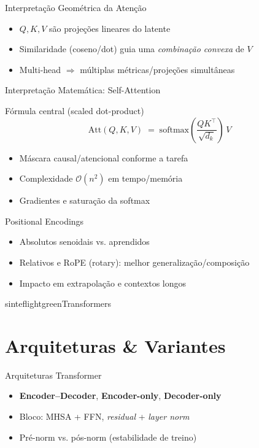 \documentclass{beamer}
\begin{document}
\begin{frame}{Interpretação Geométrica da Atenção}
	\begin{itemize}[<+->]
		\item $Q,K,V$ são projeções lineares do latente
		\item Similaridade (coseno/dot) guia uma \emph{combinação convexa} de $V$
		\item Multi-head $\Rightarrow$ múltiplas métricas/projeções simultâneas
	\end{itemize}
\end{frame}

\begin{frame}{Interpretação Matemática: Self-Attention}
	\begin{block}{Fórmula central (scaled dot-product)}
		\[
			\mathrm{Att}(Q,K,V) \;=\; \mathrm{softmax}\!\left(\frac{QK^\top}{\sqrt{d_k}}\right)\,V
		\]
	\end{block}
	\begin{itemize}[<+->]
		\item Máscara causal/atencional conforme a tarefa
		\item Complexidade $\mathcal{O}(n^2)$ em tempo/memória
		\item Gradientes e saturação da softmax
	\end{itemize}
\end{frame}

\begin{frame}{Positional Encodings}
	\begin{itemize}[<+->]
		\item Absolutos senoidais vs. aprendidos
		\item Relativos e RoPE (rotary): melhor generalização/composição
		\item Impacto em extrapolação e contextos longos
	\end{itemize}
\end{frame}

\begin{chapter}{sinteflightgreen}{Transformers}\end{chapter}

\section{Arquiteturas \& Variantes}
\begin{frame}{Arquiteturas Transformer}
	\begin{itemize}[<+->]
		\item \textbf{Encoder--Decoder}, \textbf{Encoder-only}, \textbf{Decoder-only}
		\item Bloco: MHSA + FFN, \textit{residual} + \textit{layer norm}
		\item Pré-norm vs. pós-norm (estabilidade de treino)
	\end{itemize}
\end{frame}
\end{document}
